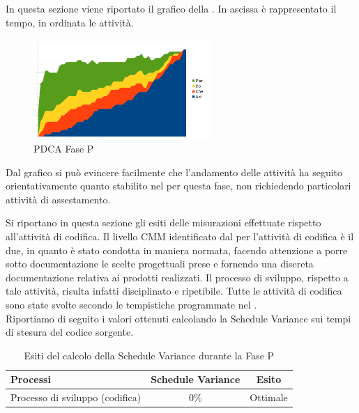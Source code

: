 In questa sezione viene riportato il grafico  della . In ascissa è rappresentato il tempo, in ordinata le attività.
\begin{figure}[H]
	\centering
	\includegraphics[width=0.6\textwidth]{PianoDiQualifica/Pics/GraficoPDCAFaseSD.pdf}
	\caption{PDCA Fase P}
\end{figure}
Dal grafico si può evincere facilmente che l'andamento delle attività ha seguito orientativamente quanto stabilito nel  per questa fase, non richiedendo particolari attività di assestamento.

Si riportano in questa sezione gli esiti delle misurazioni effettuate rispetto all'attività di codifica.
Il livello CMM identificato dal \groupname{} per l'attività di codifica è il due, in quanto è stato condotta in maniera normata, facendo attenzione a porre sotto documentazione le scelte progettuali prese e fornendo una discreta documentazione relativa ai prodotti realizzati. Il processo di sviluppo, rispetto a tale attività, risulta infatti disciplinato e ripetibile.
Tutte le attività di codifica sono state svolte secondo le tempistiche programmate nel .\\

Riportiamo di seguito i valori ottenuti calcolando la Schedule Variance sui tempi di stesura del codice sorgente.
			\begin{table}[H]
				\centering
				\begin{tabu}{| l | c | c |}
					\hline
						Processi 							& Schedule Variance	& Esito		\\ \hline \hline
						Processo di sviluppo (codifica) & 0\% & Ottimale \\ \hline
				\end{tabu}
				\caption{Esiti del calcolo della Schedule Variance durante la Fase P}
			\end{table}	
			
